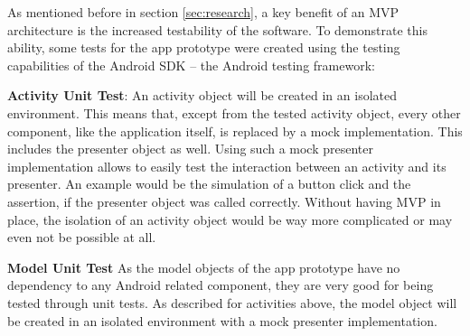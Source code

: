 As mentioned before in section \ref{sec:research}, a key benefit of an MVP architecture is the increased testability of the software.
To demonstrate this ability, some tests for the app prototype were created using the testing capabilities of the Android SDK -- the Android testing framework:

\textbf{Activity Unit Test}:
An activity object will be created in an isolated environment. This means that, except from the tested activity object, every other component, like the application itself, is replaced by a mock implementation. This includes the presenter object as well. Using such a mock presenter implementation allows to easily test the interaction between an activity and its presenter.
An example would be the simulation of a button click and the assertion, if the presenter object was called correctly.
Without having MVP in place, the isolation of an activity object would be way more complicated or may even not be possible at all.

\textbf{Model Unit Test}
As the model objects of the app prototype have no dependency to any Android related component, they are very good for being tested through unit tests. As described for activities above, the model object will be created in an isolated environment with a mock presenter implementation.
